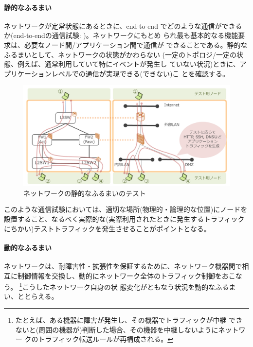     \paragraph{静的なふるまい}
ネットワークが定常状態にあるときに、end-to-end でどのような通信ができる
か(end-to-endの通信試験: )。ネットワークにもとめ
られ最も基本的なる機能要求は、必要なノード間/アプリケーション間で通信が
できることである。静的なふるまいとして、ネットワークの状態がかわらない
(一定のトポロジ/一定の状態、例えば、通常利用していて特にイベントが発生し
ていない状況)ときに、アプリケーションレベルでの通信が実現できる(できない)こ
とを確認する。
\begin{figure}[h]
 \centering
 \includegraphics[scale=0.5]{img/test-static.png}
 \caption{ネットワークの静的なふるまいのテスト}
 \label{fig:test-static}
\end{figure}

このような通信試験においては、適切な場所(物理的・論理的な位置)にノードを
設置すること、なるべく実際的な(実際利用されたときに発生するトラフィック
にちかい)テストトラフィックを発生させることがポイントとなる。

    \paragraph{動的なふるまい}
ネットワークは、耐障害性・拡張性を保証するために、ネットワーク機器間で相
互に制御情報を交換し、動的にネットワーク全体のトラフィック制御をおこなう。
\footnote{たとえば、ある機器に障害が発生し、その機器でトラフィックが中継
できないと(周囲の機器が)判断した場合、その機器を中継しないようにネットワー
クのトラフィック転送ルールが再構成される。}こうしたネットワーク自身の状
態変化がともなう状況を動的なふるまい、ととらえる。

